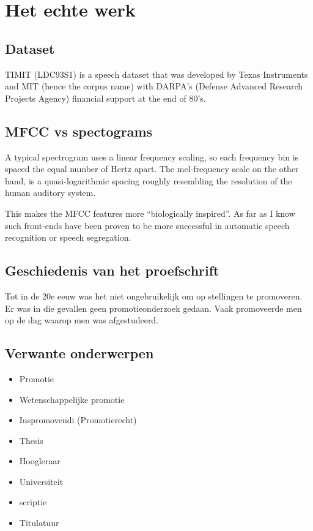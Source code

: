 \chapter{Het echte werk}
\label{cha:het-echte-werk}

\section{Dataset}
TIMIT (LDC93S1) is a speech dataset that was developed by Texas Instruments and MIT (hence the corpus name) with DARPA’s (Defense Advanced Research Projects Agency) financial support at the end of 80’s. 

\section{MFCC vs spectograms}
\label{sec:titel-om-hier}

A typical spectrogram uses a linear frequency scaling, so each frequency bin is spaced the equal number of Hertz apart. The mel-frequency scale on the other hand, is a quasi-logarithmic spacing roughly resembling the resolution of the human auditory system.

This makes the MFCC features more “biologically inspired”. As far as I know such front-ends have been proven to be more successful in automatic speech recognition or speech segregation.

\section{Geschiedenis van het proefschrift}
\label{sec:geschiedenis-van-het}


Tot in de 20e eeuw was het niet ongebruikelijk om op stellingen te
promoveren. Er was in die gevallen geen promotieonderzoek gedaan. Vaak
promoveerde men op de dag waarop men was afgestudeerd.

\section{Verwante onderwerpen}
\label{sec:verwante-onderwerpen}

\begin{itemize}
\item Promotie~\cite{h2g2}
\item Wetenschappelijke promotie
\item Iuspromovendi (Promotierecht)
\item Thesis
\item Hoogleraar
\item Universiteit
\item scriptie\cite{pratchett06:_good_omens}
\item Titulatuur
\end{itemize}


